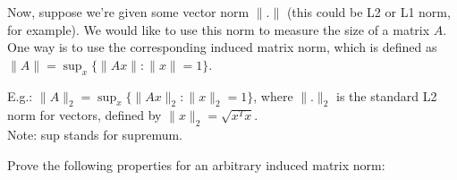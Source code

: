 \documentclass[solution,addpoints,12pt]{exam}
\newenvironment{Solution}{\begin{solution}}{\end{solution}}
\begin{document}
\begin{questions}
Now, suppose we're given some vector norm $\|.\|$ (this could be L2 or L1 norm, for example). We would like to use this norm to measure the size of a matrix $A$. One way is to use the corresponding induced matrix norm, which is defined as $\|A\| = \sup_{x} \{\| Ax \| : \|x \| = 1\}$.

E.g.: $\|A\|_2 = \sup_{x} \{ \|Ax\|_2 : \|x\|_2 = 1 \}$, where $\|.\|_2$ is the standard L2 norm for vectors, defined by $\|x\|_2 = \sqrt{x^Tx}$.\\
Note: sup stands for supremum.

Prove the following properties for an arbitrary induced matrix norm:

\end{questions}
\end{document}
